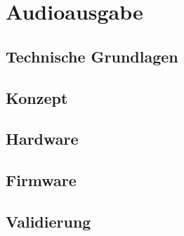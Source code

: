 \chapter{Audioausgabe}
\label{Audioausgabe}
\thispagestyle{fancy}  
\section{Technische Grundlagen}
\section{Konzept}
\section{Hardware}
\section{Firmware}
\section{Validierung}